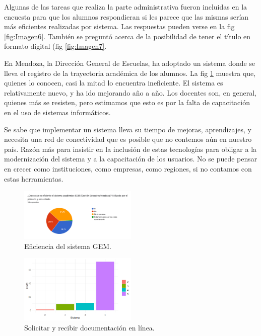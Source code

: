 \documentclass[a4paper]{article}
\begin{document}
Algunas de las tareas que realiza la parte administrativa fueron incluidas en la encuesta para que los alumnos respondieran si les parece que las mismas serían más eficientes realizadas por sistema. Las respuestas pueden verse en la fig \ref{fig:Imagen6}. También se preguntó acerca de la posibilidad de tener el título en formato digital (fig \ref{fig:Imagen7}. 

En Mendoza, la Dirección General de Escuelas, ha adoptado un sistema donde se lleva el registro de la trayectoria académica de los alumnos. La fig \ref{fig:Imagen8} muestra que, quienes lo conocen, casi la mitad lo encuentra ineficiente. El sistema es relativamente nuevo, y ha ido mejorando año a año. Los docentes son, en general, quienes más se resisten, pero estimamos que esto es por la falta de capacitación en el uso de sistemas informáticos. 

Se sabe que implementar un sistema lleva su tiempo de mejoras, aprendizajes, y necesita una red de conectividad que es posible que no contemos aún en nuestro país. Razón más para insistir en la inclusión de estas tecnologías para obligar a la modernización del sistema y a la capacitación de los usuarios. No se puede pensar en crecer como instituciones, como empresas, como regiones, si no contamos con estas herramientas. 

\begin{figure}
\centering
\includegraphics[width=0.5\textwidth]{Imagen8.png}
\caption{\label{fig:Imagen8}Eficiencia del sistema GEM.}
\end{figure}
\begin{figure}
\centering
\includegraphics[width=0.5\textwidth]{Imagen9.png}
\caption{\label{fig:Imagen9}Solicitar y recibir documentación en línea.}
\end{figure}
\end{document}
